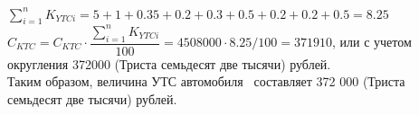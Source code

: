 \vspace{7mm}

$  \sum\limits_{i=1}^n K_{YTCi} = 5+1+0.35+0.2+0.3+0.5+0.2+0.2+0.5 = 8.25 $\\
  
$   C_{KTC} = C_{KTC} \cdot \dfrac{\sum\limits_{i=1}^n K_{YTCi}}{100} = 4508000 \cdot 8.25/100 = 371910 $, или с учетом округления 372000 (Триста семьдесят две тысячи) рублей.\\

Таким образом, величина УТС автомобиля \, составляет 372 000 (Триста семьдесят две тысячи) рублей.